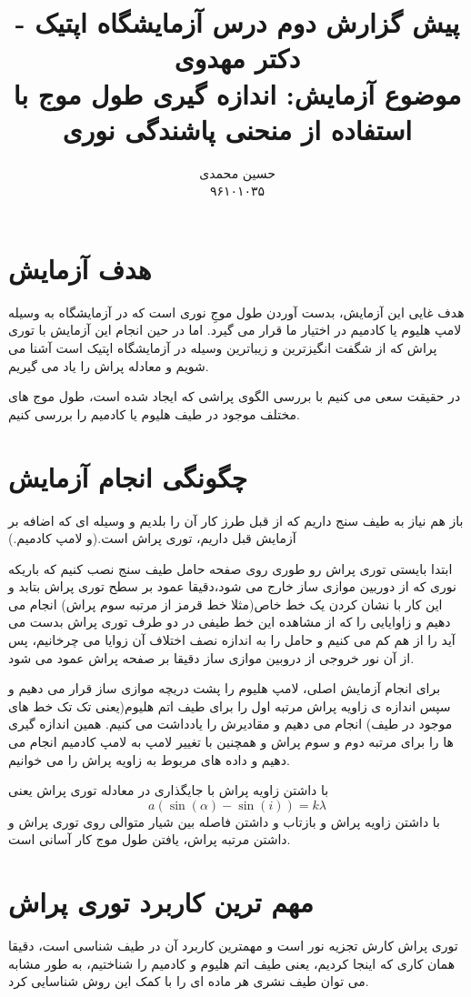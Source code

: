 \documentclass{article}
\title{	
	پیش گزارش دوم درس آزمایشگاه اپتیک - دکتر مهدوی
	\\
	\small
	موضوع آزمايش: اندازه گیری طول موج با استفاده از منحنی پاشندگی
	نوری
}
\author{
حسین محمدی 
\\
۹۶۱۰۱۰۳۵
}
\begin{document}
\maketitle
\section{هدف آزمایش}
هدف غایی این آزمایش، بدست آوردن طول موجِ نوری است که در آزمایشگاه به وسیله لامپ هلیوم یا کادمیم در اختیار ما قرار می گیرد. اما در حین انجام این آزمایش با توری پراش که از شگفت انگیزترین و زیباترین وسیله در آزمایشگاه اپتیک است آشنا می شویم و معادله پراش را یاد می گیریم.

\noindent
در حقیقت سعی می کنیم با بررسی الگوی پراشی که ایجاد شده است، طول موج های مختلف موجود در طیف هلیوم یا کادمیم را بررسی کنیم.
\section{چگونگی انجام آزمایش}
باز هم نیاز به طیف سنج داریم که از قبل طرز کار آن را بلدیم و وسیله ای که اضافه بر آزمایش قبل داریم، توری پراش است.(و لامپ کادمیم.)

ابتدا بایستی توری پراش رو طوری روی صفحه حامل طیف سنج نصب کنیم که باریکه نوری که از دوربین موازی ساز خارج می شود،‌دقیقا عمود بر سطح توری پراش بتابد و این کار با نشان کردن یک خط خاص(مثلا خط قرمز از مرتبه سوم پراش) انجام می دهیم و زاوایایی را که از مشاهده این خط طیفی در دو طرف توری پراش بدست می آید را از هم کم می کنیم و حامل را به اندازه نصف اختلاف آن زوایا می چرخانیم، پس از آن نور خروجی از دروبین موازی ساز دقیقا بر صفحه پراش عمود می شود.

برای انجام آزمایش اصلی، لامپ هلیوم را پشت دریچه موازی ساز قرار می دهیم و سپس اندازه ی زاویه پراش  مرتبه اول را برای طیف اتم هلیوم(یعنی تک تک خط های موجود در طیف) انجام می دهیم و مقادیرش را یادداشت می کنیم. همین اندازه گیری ها را برای مرتبه دوم و سوم پراش و همچنین با تغییر لامپ به لامپ کادمیم انجام می دهیم و داده های مربوط به زاویه پراش را می خوانیم.

با داشتن زاویه پراش با جایگذاری در معادله توری پراش یعنی
\[
a (\sin (\alpha) - \sin (i) ) = k \lambda
\]
با داشتن زاویه پراش و بازتاب و داشتن فاصله بین شیار متوالی روی توری پراش و داشتن مرتبه پراش، یافتن طول موج کار آسانی است.
\section{مهم ترین کاربرد توری پراش}
توری پراش کارش تجزیه نور است و مهمترین کاربرد آن در طیف شناسی است، دقیقا همان کاری که اینجا کردیم، یعنی طیف اتم هلیوم و کادمیم را شناختیم، به طور مشابه می توان طیف نشری هر ماده ای را با کمک این روش شناسایی کرد.
\end{document}
